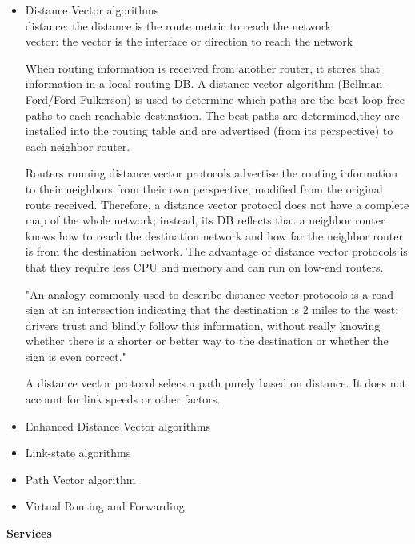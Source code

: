 \documentclass{article}
\begin{document}
\newpage
\begin{itemize}
\item Distance Vector algorithms\\

	distance: the distance is the route metric to reach the network\\
	vector: the vector is the interface or direction to reach the  network

	When routing information is received from another router, it stores that information in a local routing DB. A distance vector algorithm  (Bellman-Ford/Ford-Fulkerson) is used to determine which paths are the best loop-free paths to each reachable destination. The best paths are determined,they are installed into the routing table and are advertised (from its perspective) to each neighbor router.

	Routers running distance vector protocols advertise the routing information to their neighbors from their own perspective, modified from the original route received. Therefore, a distance vector protocol does not have a complete map of the whole network; instead, its DB reflects that a neighbor router knows how to reach the destination network and how far the neighbor router is from the destination network. The advantage of distance vector protocols is that they require less CPU and memory and can run on low-end routers.

"An analogy commonly used to describe distance vector protocols is a road sign at an intersection indicating that the destination is 2 miles to the west; drivers trust and blindly follow this information, without really knowing whether there is a shorter or better way to the destination or whether the sign is even correct."

	A distance vector protocol selecs a path purely based on distance. It does not account for link speeds or other factors.

\item Enhanced Distance Vector algorithms\\
\item Link-state algorithms\\
\item Path Vector algorithm\\
\item Virtual Routing and Forwarding\\
\end{itemize}

\newpage
\noindent\textbf{Services}\\
\end{document}
